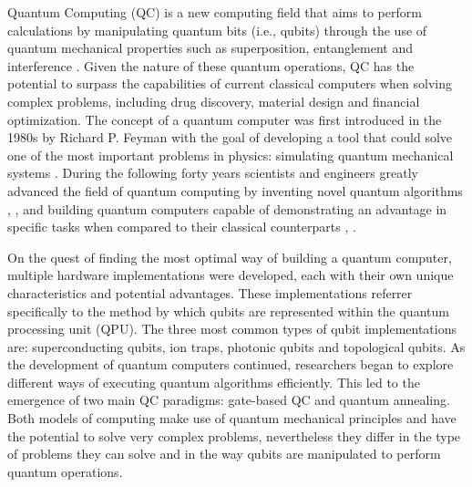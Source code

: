 \label{chapter:introduction}


Quantum Computing (QC) is a new computing field that aims to perform calculations by manipulating quantum bits (i.e., qubits) through the use of quantum mechanical properties such as superposition, entanglement and interference \cite{nielsen-2011-quantum-computation}. Given the nature of these quantum operations, QC has the potential to surpass the capabilities of current classical computers when solving complex problems, including drug discovery, material design and financial optimization. The concept of a quantum computer was first introduced in the 1980s by Richard P. Feyman with the goal of developing a tool that could solve one of the most important problems in physics: simulating quantum mechanical systems \cite{feynman-1986-quantum-computers}. During the following forty years scientists and engineers greatly advanced the field of quantum computing by inventing novel quantum algorithms \cite{deutch-1992-rapid-solutions}, \cite{shor-1997-factorization}, \cite{grover-1996-search} and building quantum computers capable of demonstrating an advantage in specific tasks when compared to their classical counterparts \cite{arute-2019-supremacy}, \cite{madsen-2022-advantage}.

On the quest of finding the most optimal way of building a quantum computer, multiple hardware implementations were developed, each with their own unique characteristics and potential advantages. These implementations referrer specifically to the method by which qubits are represented within the quantum processing unit (QPU). The three most common types of qubit implementations are: superconducting qubits, ion traps, photonic qubits and topological qubits.
As the development of quantum computers continued, researchers began to explore different ways of executing quantum algorithms efficiently. This led to the emergence of two main QC paradigms: gate-based QC and quantum annealing. Both models of computing make use of quantum mechanical principles and have the potential to solve very complex problems, nevertheless they differ in the type of problems they can solve and in the way qubits are manipulated to perform quantum operations. 

